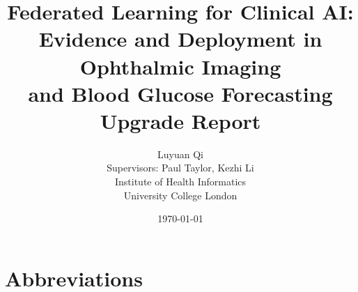 \documentclass[12pt,a4paper]{report}
\title{Federated Learning for Clinical AI:\\
Evidence and Deployment in Ophthalmic Imaging\\
and Blood Glucose Forecasting\\[2em]
\large Upgrade Report}
\author{Luyuan Qi\\[1em]
Supervisors: Paul Taylor, Kezhi Li\\ %
Institute of Health Informatics\\
University College London}
\date{\today}
\newif\ifdraft
\newcommand{\outline}[1]{\ifdraft\begin{quote}\small\itshape #1\end{quote}\fi}
\begin{document}
\maketitle

\begin{abstract}
\outline{To write last. One paragraph per chapter: the problem, the review and what it found, the glucose benchmark and deployment and what they found, the plan.}
\end{abstract}

\chapter*{Abbreviations}
\outline{Each entry gets a plain-word explanation, not just an expansion. FL, T1D, CGM, RMSE, OOD, OCT, DR, FedAvg, FedProx, MLDG, DP.}

\tableofcontents











\appendix

\end{document}
